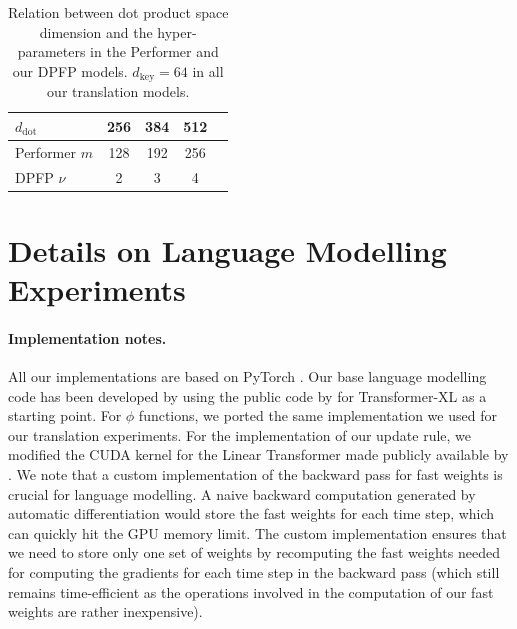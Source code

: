 \documentclass{article}
\theoremstyle{definition}
\begin{document}
\begin{table}[h]
\caption{Relation between dot product space dimension
and the hyper-parameters in the Performer and our DPFP models.
$d_{\text{key}}=64$ in all our translation models.}
\label{tab:dot-dim}
\vskip 0.15in
\begin{center}
\begin{small}
\begin{tabular}{lcccr}
\toprule
$d_{\text{dot}}$ & 256 & 384 & 512 \\
\midrule
Performer $m$ & 128 & 192 & 256  \\  
DPFP $\nu$    & 2 & 3 & 4 \\ 
\bottomrule
\end{tabular}
\end{small}
\end{center}
\vskip -0.1in
\end{table}

\section{Details on Language Modelling Experiments}
\label{app:lm}
\paragraph{Implementation notes.}
All our implementations are based on PyTorch \citep{NEURIPS2019_bdbca288}.
Our base language modelling code has been developed by using the public code by \citet{dai2019transformerxlacl} for Transformer-XL as a starting point.
For $\phi$ functions, we ported the same implementation we used for our
translation experiments.
For the implementation of our update rule,
we modified the CUDA kernel for the Linear Transformer made publicly available by \citet{katharopoulos2020transformers}.
We note that a custom implementation of the backward pass for fast weights
is crucial for language modelling.
A naive backward computation generated by automatic differentiation would store the fast weights for each time step, which can quickly hit the GPU memory limit.
The custom implementation ensures that we need to store
only one set of weights by recomputing the fast weights needed for computing
the gradients for each time step in the backward pass (which still remains time-efficient as the operations involved in the computation of our fast weights are rather inexpensive). 
\end{document}
